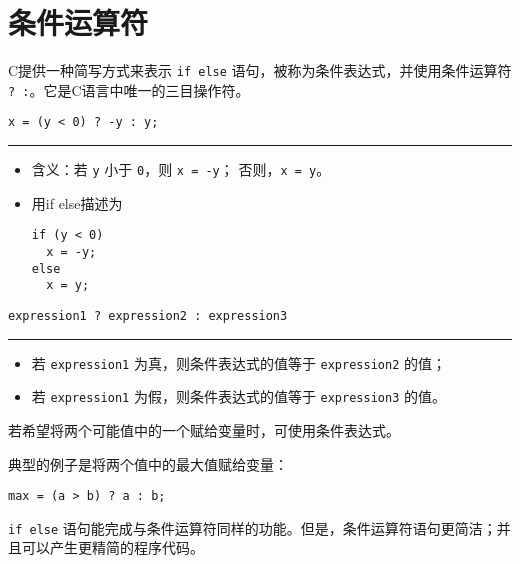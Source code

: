 \section{条件运算符}
\begin{frame}[fragile]\ft{\secname}
  C提供一种简写方式来表示 \lstinline|if else| 语句，被称为条件表达式，并使用条件运算符 \lstinline|? :|。它是C语言中唯一的三目操作符。
\end{frame}

\begin{frame}[fragile]\ft{\secname}
\begin{lstlisting}[title=求绝对值]
x = (y < 0) ? -y : y;
\end{lstlisting}
\rule{\textwidth}{.8mm} \pause \vspace{.05in}

\begin{itemize}
\item
  含义：若 \lstinline|y| 小于 \lstinline|0|，则 \lstinline|x = -y|；
  否则，\lstinline|x = y|。\\[0.1in]
\item 用if else描述为
\begin{lstlisting}
if (y < 0)
  x = -y;
else
  x = y;  
\end{lstlisting}
\end{itemize}
\end{frame}

\begin{frame}[fragile]\ft{\secname}
\begin{lstlisting}[title=条件表达式的语法]
expression1 ? expression2 : expression3
\end{lstlisting}
\rule{\textwidth}{.8mm} \pause \vspace{.05in}

\begin{itemize}
\item 若 \lstinline|expression1| 为真，则条件表达式的值等于 \lstinline|expression2| 的值；
\item 若 \lstinline|expression1| 为假，则条件表达式的值等于 \lstinline|expression3| 的值。
\end{itemize}
\end{frame}

\begin{frame}[fragile]\ft{\secname}
  若希望将两个可能值中的一个赋给变量时，可使用条件表达式。


  典型的例子是将两个值中的最大值赋给变量：
\begin{lstlisting}[frame=single]
max = (a > b) ? a : b;
\end{lstlisting} \pause 


\lstinline|if else| 语句能完成与条件运算符同样的功能。但是，条件运算符语句更简洁；并且可以产生更精简的程序代码。
\end{frame}

